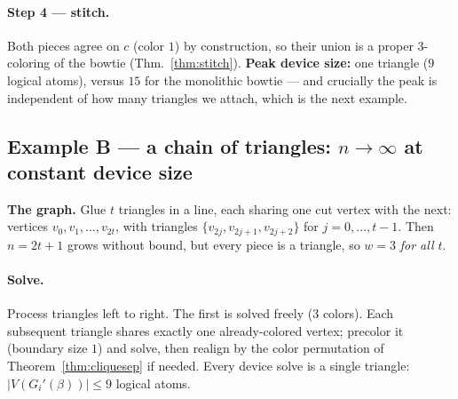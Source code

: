\documentclass[11pt]{article}
\theoremstyle{definition}
\theoremstyle{remark}
\begin{document}
\paragraph{Step 4 --- stitch.} Both pieces agree on $c$ (color $1$) by
construction, so their union is a proper $3$-coloring of the bowtie
(Thm.~\ref{thm:stitch}). \textbf{Peak device size:} one triangle ($9$ logical
atoms), versus $15$ for the monolithic bowtie --- and crucially the peak is
independent of how many triangles we attach, which is the next example.

\subsection{Example B --- a chain of triangles: $n\to\infty$ at constant device size}
\label{ex:chain}

\textbf{The graph.} Glue $t$ triangles in a line, each sharing one cut vertex with
the next: vertices $v_0,v_1,\dots,v_{2t}$, with triangles
$\{v_{2j},v_{2j+1},v_{2j+2}\}$ for $j=0,\dots,t-1$. Then $n=2t+1$ grows without
bound, but every piece is a triangle, so $w=3$ \emph{for all $t$}.

\begin{center}
\end{center}

\paragraph{Solve.} Process triangles left to right. The first is solved freely
($3$ colors). Each subsequent triangle shares exactly one already-colored vertex;
precolor it (boundary size $1$) and solve, then realign by the color permutation of
Theorem~\ref{thm:cliquesep} if needed. Every device solve is a single triangle:
$|V(G_i'(\beta))| \le 9$ logical atoms.
\end{document}
